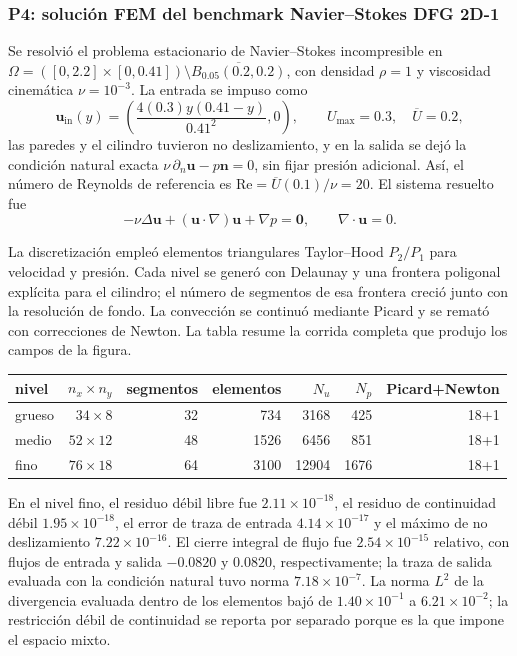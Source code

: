 \subsubsection{P4: solución FEM del benchmark Navier--Stokes DFG 2D-1}

Se resolvió el problema estacionario de Navier--Stokes incompresible en
\(\Omega=([0,2.2]\times[0,0.41])\setminus\overline{B_{0.05}(0.2,0.2)}\), con
densidad \(\rho=1\) y viscosidad cinemática \(\nu=10^{-3}\). La entrada se
impuso como
\[
 \mathbf u_{\mathrm{in}}(y)=\left(\frac{4(0.3)y(0.41-y)}{0.41^2},0\right),
 \qquad U_{\max}=0.3,\quad \overline U=0.2,
\]
las paredes y el cilindro tuvieron no deslizamiento, y en la salida se dejó la
condición natural exacta \(\nu\,\partial_n\mathbf u-p\mathbf n=0\), sin fijar
presión adicional. Así, el número de Reynolds de referencia es
\(\mathrm{Re}=\overline U(0.1)/\nu=20\). El sistema resuelto fue
\[
 -\nu\Delta\mathbf u+(\mathbf u\cdot\nabla)\mathbf u+\nabla p=\mathbf0,
 \qquad \nabla\cdot\mathbf u=0.
\]

La discretización empleó elementos triangulares Taylor--Hood \(P_2/P_1\) para
velocidad y presión. Cada nivel se generó con Delaunay y una frontera
poligonal explícita para el cilindro; el número de segmentos de esa frontera
creció junto con la resolución de fondo. La convección se continuó mediante
Picard y se remató con correcciones de Newton. La tabla resume la corrida
completa que produjo los campos de la figura.

\begin{center}
\small
\begin{tabular}{lrrrrrr}
\hline
nivel & $n_x\times n_y$ & segmentos & elementos & $N_u$ & $N_p$ & Picard+Newton\\
\hline
grueso & $34\times8$ & 32 & 734 & 3168 & 425 & 18+1\\
medio  & $52\times12$ & 48 & 1526 & 6456 & 851 & 18+1\\
fino   & $76\times18$ & 64 & 3100 & 12904 & 1676 & 18+1\\
\hline
\end{tabular}
\end{center}

En el nivel fino, el residuo débil libre fue
\(2.11\times10^{-18}\), el residuo de continuidad débil
\(1.95\times10^{-18}\), el error de traza de entrada
\(4.14\times10^{-17}\) y el máximo de no deslizamiento
\(7.22\times10^{-16}\). El cierre integral de flujo fue
\(2.54\times10^{-15}\) relativo, con flujos de entrada y salida
\(-0.0820\) y \(0.0820\), respectivamente; la traza de salida evaluada con
la condición natural tuvo norma \(7.18\times10^{-7}\). La norma \(L^2\) de
la divergencia evaluada dentro de los elementos bajó de
\(1.40\times10^{-1}\) a \(6.21\times10^{-2}\); la restricción débil de
continuidad se reporta por separado porque es la que impone el espacio mixto.

